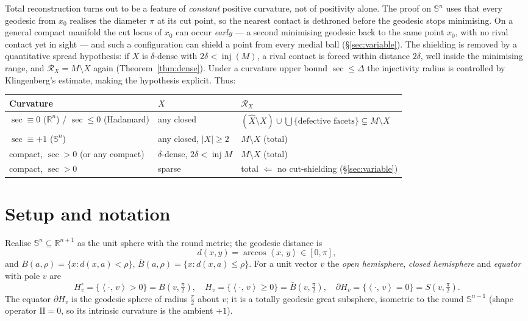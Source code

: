\documentclass[11pt]{article}
\theoremstyle{remark}
\newcommand{\R}{\mathbb{R}}
\newcommand{\X}{X}
\newcommand{\Xhat}{\widehat{\X}}
\newcommand{\Rx}{\mathcal{R}_{\X}}
\newcommand{\inj}{\operatorname{inj}}
\newcommand{\sca}[2]{\left\langle #1,\, #2\right\rangle}
\newcommand{\Sn}{\mathbb{S}^{n}}
\begin{document}
Total reconstruction turns out to be a feature of \emph{constant} positive
curvature, not of positivity alone. The proof on $\Sn$ uses that every
geodesic from $x_{0}$ realises the diameter $\pi$ at its cut point, so the
nearest contact is dethroned before the geodesic stops minimising. On a
general compact manifold the cut locus of $x_{0}$ can occur \emph{early}
--- a second minimising geodesic back to the same point $x_{0}$, with no
rival contact yet in sight --- and such a configuration can shield a point
from every medial ball (\S\ref{sec:variable}). The shielding is removed by
a quantitative spread hypothesis: if $\X$ is $\delta$-dense with
$2\delta<\inj(M)$, a rival contact is forced within distance $2\delta$,
well inside the minimising range, and $\Rx=M\setminus\X$ again
(Theorem~\ref{thm:dense}). Under a curvature upper bound $\sec\le\Delta$
the injectivity radius is controlled by Klingenberg's estimate, making the
hypothesis explicit. Thus:
\begin{center}
\begin{tabular}{lll}
\toprule
Curvature & $\X$ & $\Rx$\\
\midrule
$\sec\equiv0$ ($\R^{n}$) / $\sec\le0$ (Hadamard) & any closed &
$(\Xhat\setminus\X)\cup\bigcup\{\text{defective facets}\}\subsetneq M\setminus\X$\\
$\sec\equiv+1$ ($\Sn$) & any closed, $|\X|\ge2$ & $M\setminus\X$ (total)\\
compact, $\sec>0$ (or any compact) & $\delta$-dense, $2\delta<\inj M$ &
$M\setminus\X$ (total)\\
compact, $\sec>0$ & sparse & total $\Leftarrow$ no cut-shielding (\S\ref{sec:variable})\\
\bottomrule
\end{tabular}
\end{center}

\section{Setup and notation}\label{sec:setup}

Realise $\Sn\subseteq\R^{n+1}$ as the unit sphere with the round metric;
the geodesic distance is
\[
  d(x,y)=\arccos\sca{x}{y}\in[0,\pi],
\]
and $B(a,\rho)=\{x:d(x,a)<\rho\}$, $\bar B(a,\rho)=\{x:d(x,a)\le\rho\}$.
For a unit vector $v$ the \emph{open hemisphere}, \emph{closed
hemisphere} and \emph{equator} with pole $v$ are
\[
  H_{v}^{\circ}=\{\sca{\cdot}{v}>0\}=B(v,\tfrac\pi2),\quad
  H_{v}=\{\sca{\cdot}{v}\ge0\}=\bar B(v,\tfrac\pi2),\quad
  \partial H_{v}=\{\sca{\cdot}{v}=0\}=S(v,\tfrac\pi2).
\]
The equator $\partial H_{v}$ is the geodesic sphere of radius $\tfrac\pi2$
about $v$; it is a totally geodesic great subsphere, isometric to the
round $\mathbb{S}^{n-1}$ (shape operator $\mathrm{II}=0$, so its intrinsic
curvature is the ambient $+1$).
\end{document}

